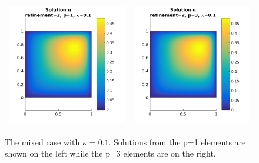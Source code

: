 \documentclass{article}
\begin{document}
\begin{figure}[!ht]
\begin{tabular}{c c}
\includegraphics[scale=0.7]{umu_132.png} & 
\includegraphics[scale=0.7]{umu_232.png}
\end{tabular}
\caption{The mixed case with $\kappa = 0.1$. Solutions from the p=1 elements are shown on the left while the p=3 elements are on the right.}
\label{fig:u10}
\end{figure}
\end{document}
